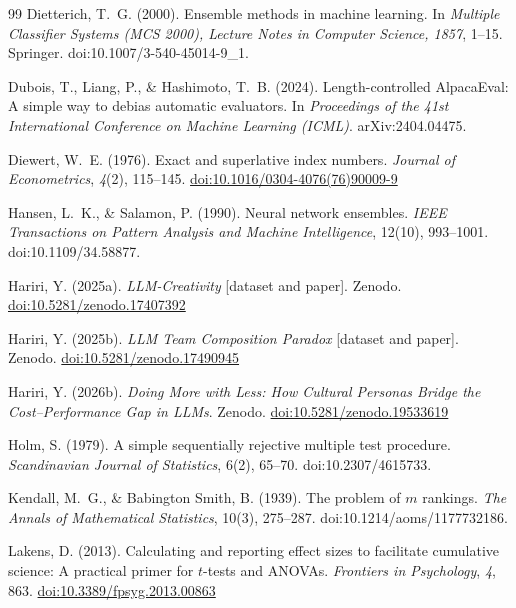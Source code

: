 \documentclass[12pt,a4paper]{article}
\begin{document}
\begin{thebibliography}{99}
Dietterich, T.~G. (2000). Ensemble methods in machine learning. In
\emph{Multiple Classifier Systems (MCS 2000), Lecture Notes in Computer
Science, 1857}, 1--15. Springer. doi:10.1007/3-540-45014-9\_1.

Dubois, T., Liang, P., \& Hashimoto, T.~B. (2024). Length-controlled
AlpacaEval: A simple way to debias automatic evaluators. In
\emph{Proceedings of the 41st International Conference on Machine Learning
(ICML)}. arXiv:2404.04475.

Diewert, W.~E. (1976).
Exact and superlative index numbers.
\textit{Journal of Econometrics}, \textit{4}(2), 115--145.
\href{https://doi.org/10.1016/0304-4076(76)90009-9}{doi:10.1016/0304-4076(76)90009-9}

Hansen, L.~K., \& Salamon, P. (1990). Neural network ensembles.
\emph{IEEE Transactions on Pattern Analysis and Machine Intelligence},
12(10), 993--1001. doi:10.1109/34.58877.

Hariri, Y. (2025a).
\textit{LLM-Creativity} [dataset and paper]. Zenodo.
\href{https://doi.org/10.5281/zenodo.17407392}{doi:10.5281/zenodo.17407392}

Hariri, Y. (2025b).
\textit{LLM Team Composition Paradox} [dataset and paper]. Zenodo.
\href{https://doi.org/10.5281/zenodo.17490945}{doi:10.5281/zenodo.17490945}

Hariri, Y. (2026b).
\textit{Doing More with Less: How Cultural Personas Bridge the Cost--Performance
  Gap in LLMs}. Zenodo.
\href{https://doi.org/10.5281/zenodo.19533619}{doi:10.5281/zenodo.19533619}

Holm, S. (1979). A simple sequentially rejective multiple test procedure.
\emph{Scandinavian Journal of Statistics}, 6(2), 65--70.
doi:10.2307/4615733.

Kendall, M.~G., \& Babington Smith, B. (1939). The problem of $m$ rankings.
\emph{The Annals of Mathematical Statistics}, 10(3), 275--287.
doi:10.1214/aoms/1177732186.

Lakens, D. (2013).
Calculating and reporting effect sizes to facilitate cumulative science: A
  practical primer for $t$-tests and ANOVAs.
\textit{Frontiers in Psychology}, \textit{4}, 863.
\href{https://doi.org/10.3389/fpsyg.2013.00863}{doi:10.3389/fpsyg.2013.00863}


\end{thebibliography}
\end{document}
